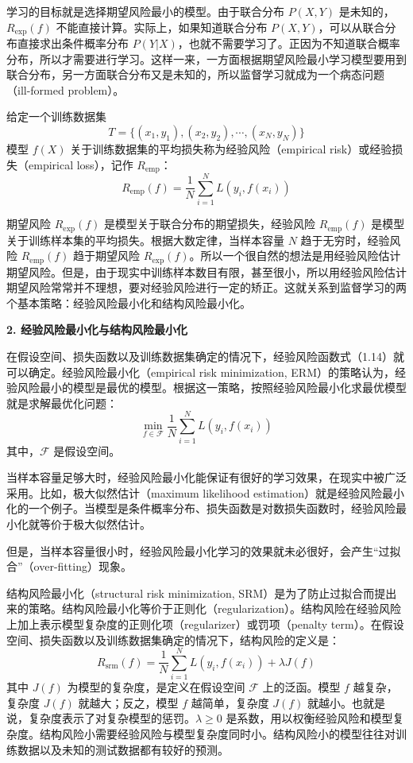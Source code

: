 \documentclass[UTF8,12pt,a4paper,fontset=fandol]{ctexart}
\begin{document}
学习的目标就是选择期望风险最小的模型。由于联合分布 $P(X,Y)$ 是未知的，$R_{\exp}(f)$ 不能直接计算。实际上，如果知道联合分布 $P(X,Y)$，可以从联合分布直接求出条件概率分布 $P(Y|X)$，也就不需要学习了。正因为不知道联合概率分布，所以才需要进行学习。这样一来，一方面根据期望风险最小学习模型要用到联合分布，另一方面联合分布又是未知的，所以监督学习就成为一个病态问题（ill-formed problem）。

给定一个训练数据集
\[
  T=\{(x_1,y_1),(x_2,y_2),\cdots,(x_N,y_N)\}
\]
模型 $f(X)$ 关于训练数据集的平均损失称为经验风险（empirical risk）或经验损失（empirical loss），记作 $R_{\mathrm{emp}}$：
\begin{equation}
  R_{\mathrm{emp}}(f)=\frac1N\sum_{i=1}^N L(y_i,f(x_i))
  \tag{1.14}
\end{equation}

期望风险 $R_{\exp}(f)$ 是模型关于联合分布的期望损失，经验风险 $R_{\mathrm{emp}}(f)$ 是模型关于训练样本集的平均损失。根据大数定律，当样本容量 $N$ 趋于无穷时，经验风险 $R_{\mathrm{emp}}(f)$ 趋于期望风险 $R_{\exp}(f)$。所以一个很自然的想法是用经验风险估计期望风险。但是，由于现实中训练样本数目有限，甚至很小，所以用经验风险估计期望风险常常并不理想，要对经验风险进行一定的矫正。这就关系到监督学习的两个基本策略：经验风险最小化和结构风险最小化。

\noindent\textbf{2. 经验风险最小化与结构风险最小化}

在假设空间、损失函数以及训练数据集确定的情况下，经验风险函数式（1.14）就可以确定。经验风险最小化（empirical risk minimization, ERM）的策略认为，经验风险最小的模型是最优的模型。根据这一策略，按照经验风险最小化求最优模型就是求解最优化问题：
\begin{equation}
  \min_{f\in\mathcal F}\frac1N\sum_{i=1}^N L(y_i,f(x_i))
  \tag{1.15}
\end{equation}
其中，$\mathcal F$ 是假设空间。

当样本容量足够大时，经验风险最小化能保证有很好的学习效果，在现实中被广泛采用。比如，极大似然估计（maximum likelihood estimation）就是经验风险最小化的一个例子。当模型是条件概率分布、损失函数是对数损失函数时，经验风险最小化就等价于极大似然估计。

但是，当样本容量很小时，经验风险最小化学习的效果就未必很好，会产生“过拟合”（over-fitting）现象。

结构风险最小化（structural risk minimization, SRM）是为了防止过拟合而提出来的策略。结构风险最小化等价于正则化（regularization）。结构风险在经验风险上加上表示模型复杂度的正则化项（regularizer）或罚项（penalty term）。在假设空间、损失函数以及训练数据集确定的情况下，结构风险的定义是：
\begin{equation}
  R_{\mathrm{srm}}(f)=\frac1N\sum_{i=1}^N L(y_i,f(x_i))+\lambda J(f)
  \tag{1.16}
\end{equation}
其中 $J(f)$ 为模型的复杂度，是定义在假设空间 $\mathcal F$ 上的泛函。模型 $f$ 越复杂，复杂度 $J(f)$ 就越大；反之，模型 $f$ 越简单，复杂度 $J(f)$ 就越小。也就是说，复杂度表示了对复杂模型的惩罚。$\lambda\ge0$ 是系数，用以权衡经验风险和模型复杂度。结构风险小需要经验风险与模型复杂度同时小。结构风险小的模型往往对训练数据以及未知的测试数据都有较好的预测。
\end{document}
